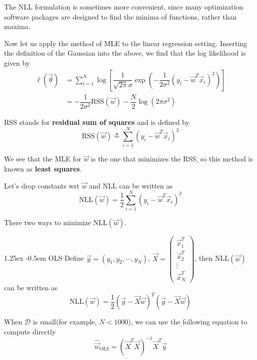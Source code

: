\documentclass[8pt]{article}
\makeatletter
\newlength{\norm}
\newlength{\nrm}
\newlength{\sm}
\renewcommand{\paragraph}{%
  \@startsection{paragraph}{4}%
  {\z@}{1.25ex \@plus 2pt \@minus 2pt}{-0.5em}%
  {\fontsize{\f@size}{\nrm}\normalfont\bfseries}%
}
\makeatother
\begin{document}
The NLL formulation is sometimes more convenient, since many optimization software packages are designed to find the minima of functions, rather than maxima.

Now let us apply the method of MLE to the linear regression setting. Inserting the definition of the Gaussian into the above, we find that the log likelihood is given by
\begin{align}
\ell(\vec{\theta})& =\sum\limits_{i=1}^N \log\left[\dfrac{1}{\sqrt{2\pi}\sigma}\exp\left(-\dfrac{1}{2\sigma^2}(y_i-\vec{w}^T\vec{x}_i)^2\right)\right] \\
     & =-\dfrac{1}{2\sigma^2}\text{RSS}(\vec{w})-\dfrac{N}{2}\log(2\pi\sigma^2)
\end{align}

RSS stands for \textbf{residual sum of squares} and is defined by
\begin{equation}
\text{RSS}(\vec{w}) \triangleq \sum\limits_{i=1}^N (y_i-\vec{w}^T\vec{x}_i)^2
\end{equation}

We see that the MLE for $\vec{w}$ is the one that minimizes the RSS, so this method is known as \textbf{least squares}.

Let's drop constants wrt $\vec{w}$ and NLL can be written as
\begin{equation}
\text{NLL}(\vec{w}) = \dfrac{1}{2}\sum\limits_{i=1}^N (y_i-\vec{w}^T\vec{x}_i)^2
\end{equation}

There two ways to minimize NLL$(\vec{w})$.


\paragraph{OLS}
Define $\vec{y}=(y_1,y_2,\cdots,y_N)$, $\vec{X}=\left(\begin{array}{c}\vec{x}_1^T \\ \vec{x}_2^T \\ \vdots \\ \vec{x}_N^T\end{array}\right)$, then NLL$(\vec{w})$ can be written as
\begin{equation}
\text{NLL}(\vec{w})=\dfrac{1}{2}(\vec{y}-\vec{X}\vec{w})^T(\vec{y}-\vec{X}\vec{w})
\end{equation}

When $\mathcal{D}$ is small(for example, $N < 1000$), we can use the following equation to compute  directly
\begin{equation}
\hat{\vec{w}}_{\mathrm{OLS}}=(\vec{X}^T\vec{X})^{-1}\vec{X}^T\vec{y}
\end{equation}
\end{document}
